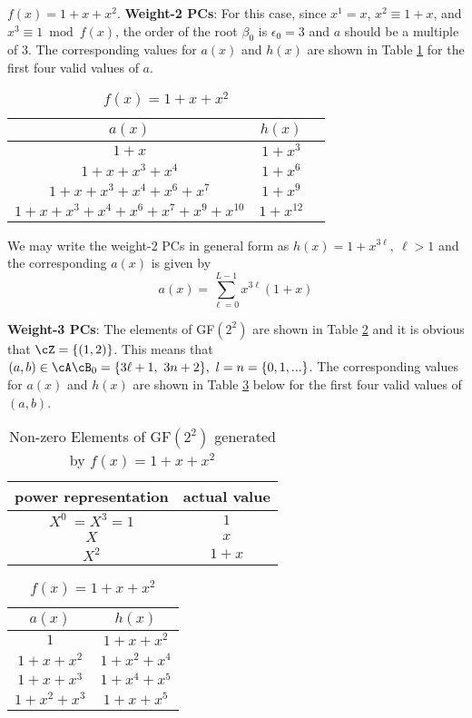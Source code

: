 \begin{example}$f(x)=1+x+x^2$.\newline 
\textbf{Weight-2 PCs}: 
For this case, since $x^1=x$, $x^2 \equiv 1+x$, and $x^3 \equiv 1 \bmod f(x)$, the order of the root $\beta_0$ is $\epsilon_0=3$ and $a$ should be a multiple of $3$. The corresponding values for $a(x)$ and $h(x)$ are shown in Table \ref{novelTab2} for the first four valid values of $a$.
\begin{table}[htbp]
 \caption{$f(x)=1+x+x^2$}
\centering
 \begin{tabular}{c c c} 
 $a(x)$ & $h(x)$ \\ [0.5ex] 
 \hline\hline
$1+x$
 & $1+x^{3}$ \\
\hline
$1+x+x^3+x^4$
 & $1+x^{6}$ 
 \\
\hline
$1+x+x^3+x^4+x^6+x^{7}$ 
&  $1+x^{9}$ 
\\
\hline
$1+x+x^3+x^4+x^6+x^{7}+x^9+x^{10}$
 &  $1+x^{12}$ \\
 \end{tabular}
 \label{novelTab2}
\end{table}
\label{ex-2}

We may write the weight-2 PCs in general form as $h(x)=1+x^{3\ell},~\ell>1$ and the corresponding $a(x)$ is given by 
\begin{equation*}
a(x)=\sum_{\ell=0}^{L-1} x^{3\ell}(1+x)
\end{equation*}

\textbf{Weight-3 PCs}: The elements of GF$(2^2)$ are shown in Table \ref{novelTab7} and it is obvious that $\cZ=\{(1,2)\}$.
This means that $(a,b) \in \cA \cB_0=\{3\ell+1,~3n+2\},~l=n=\left\{0,1,...\right\}$.  The corresponding values for $a(x)$ and $h(x)$ are shown in Table \ref{novelTab8} below for the first four valid values of $(a,b)$.
 \begin{table}[htbp]
 \caption{Non-zero Elements of GF$(2^2)$ generated by $f(x)=1+x+x^2$}
\centering
 \begin{tabular}{c c} 
 \hline
 power representation & actual value \\ [0.5ex] 
 \hline\hline
$X^0~=X^3=1$ & $1$\\
\hline
$X$ & $x$\\
\hline
$X^2$ &  $1+x$\\
\hline
 \end{tabular}
 \label{novelTab7}
\end{table}

\begin{table}[htbp]
 \caption{$f(x)=1+x+x^2$}
\centering
 \begin{tabular}{c c} 
 \hline
 $a(x)$ & $h(x)$\\ [0.5ex] 
 \hline\hline
$1$ & $1+x+x^2$\\ 
\hline
$1+x+x^2$ &  $1+x^2+x^4$\\
\hline
$1+x+x^3$ & $1+x^4+x^5$\\
\hline
$1+x^2+x^3$ & $1+x+x^5$ 
 \end{tabular}
 \label{novelTab8}
\end{table}


\end{example}
